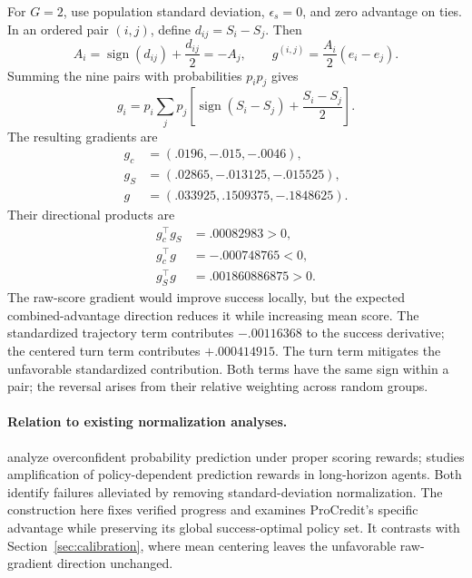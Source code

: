 \documentclass[11pt]{article}
\newcommand{\sgn}{\operatorname{sign}}
\begin{document}
For $G=2$, use population standard deviation, $\epsilon_s=0$, and zero advantage on ties. In an ordered pair $(i,j)$, define $d_{ij}=S_i-S_j$. Then
\begin{equation}
A_i=\sgn(d_{ij})+\frac{d_{ij}}2=-A_j,
\qquad
g^{(i,j)}=\frac{A_i}{2}(e_i-e_j).
\end{equation}
Summing the nine pairs with probabilities $p_ip_j$ gives
\begin{equation}
g_i=p_i\sum_jp_j\left[\sgn(S_i-S_j)+\frac{S_i-S_j}{2}\right].
\end{equation}
The resulting gradients are
\begin{align}
g_c&=(.0196,-.015,-.0046),\nonumber\\
g_S&=(.02865,-.013125,-.015525),\nonumber\\
g&=(.033925,.1509375,-.1848625).
\end{align}
Their directional products are
\begin{align}
g_c^\top g_S&=.00082983>0,\nonumber\\
g_c^\top g&=-.000748765<0,\nonumber\\
g_S^\top g&=.001860886875>0.
\label{eq:prodots}
\end{align}
The raw-score gradient would improve success locally, but the expected combined-advantage direction reduces it while increasing mean score. The standardized trajectory term contributes $-.00116368$ to the success derivative; the centered turn term contributes $+.000414915$. The turn term mitigates the unfavorable standardized contribution. Both terms have the same sign within a pair; the reversal arises from their relative weighting across random groups.

\paragraph{Relation to existing normalization analyses.}
\citet{bereket2025uncalibrated} analyze overconfident probability prediction under proper scoring rewards; \citet{wang2026darkroom} studies amplification of policy-dependent prediction rewards in long-horizon agents. Both identify failures alleviated by removing standard-deviation normalization. The construction here fixes verified progress and examines ProCredit's specific advantage while preserving its global success-optimal policy set. It contrasts with Section~\ref{sec:calibration}, where mean centering leaves the unfavorable raw-gradient direction unchanged.
\end{document}
